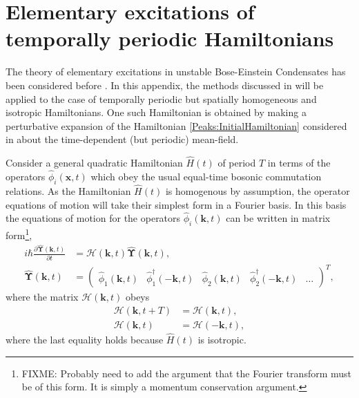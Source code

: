 \chapter{Elementary excitations of temporally periodic Hamiltonians}
\label{PeaksAppendix}
\graphicspath{{Figures/PeaksAppendix/}{Figures/Common/}}

The theory of elementary excitations in unstable Bose-Einstein Condensates has been considered before \citep{Leonhardt:2003}. In this appendix, the methods discussed in \citep{Leonhardt:2003} will be applied to the case of temporally periodic but spatially homogeneous and isotropic Hamiltonians. One such Hamiltonian is obtained by making a perturbative expansion of the Hamiltonian \eqref{Peaks:InitialHamiltonian} considered in  about the time-dependent (but periodic) mean-field.

Consider a general quadratic Hamiltonian $\hat{H}(t)$ of period $T$ in terms of the operators $\hat{\phi}_i(\bm{x}, t)$ which obey the usual equal-time bosonic commutation relations. As the Hamiltonian $\hat{H}(t)$ is homogenous by assumption, the operator equations of motion will take their simplest form in a Fourier basis. In this basis the equations of motion for the operators $\hat{\phi}_i(\bm{k}, t)$ can be written in matrix form\footnote{FIXME: Probably need to add the argument that the Fourier transform must be of this form. It is simply a momentum conservation argument.},
\begin{subequations}
    \label{PeaksAppendix:MatrixOperatorEvolution}
    \begin{align}
        i \hbar \frac{\partial \hat{\bm{\Upsilon}}(\bm{k}, t)}{\partial t} &= \mathcal{H}(\bm{k}, t) \hat{\bm{\Upsilon}}(\bm{k}, t),\\
        \hat{\bm{\Upsilon}}(\bm{k}, t) &= 
        \begin{pmatrix}
            \hat{\phi}_1(\bm{k}, t) &
            \hat{\phi}_1^\dagger(-\bm{k}, t) &
            \hat{\phi}_2(\bm{k}, t) &
            \hat{\phi}_2^\dagger(-\bm{k}, t) &
            \dots
        \end{pmatrix}^T,
    \end{align}
\end{subequations}
where the matrix $\mathcal{H}(\bm{k}, t)$ obeys
\begin{align}
        \mathcal{H}(\bm{k}, t+T) &= \mathcal{H}(\bm{k}, t),\\
        \mathcal{H}(\bm{k}, t) &= \mathcal{H}(-\bm{k}, t), \label{PeaksAppendix:HReflectionSymmetry}
\end{align}
where the last equality holds because $\hat{H}(t)$ is isotropic.

